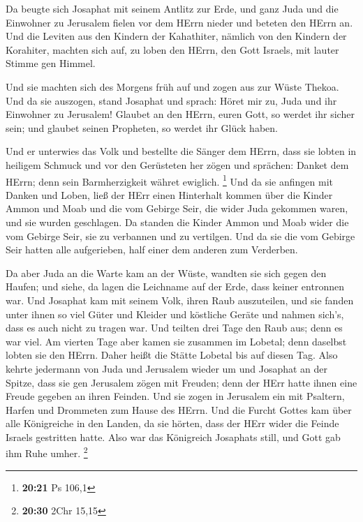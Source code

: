  Da beugte sich Josaphat mit seinem Antlitz zur Erde, und
ganz Juda und die Einwohner zu Jerusalem fielen vor dem HErrn nieder und
beteten den HErrn an.  Und die Leviten aus den Kindern der
Kahathiter, nämlich von den Kindern der Korahiter, machten sich auf, zu
loben den HErrn, den Gott Israels, mit lauter Stimme gen Himmel.

 Und sie machten sich des Morgens früh auf und zogen aus
zur Wüste Thekoa. Und da sie auszogen, stand Josaphat und sprach: Höret
mir zu, Juda und ihr Einwohner zu Jerusalem! Glaubet an den HErrn, euren
Gott, so werdet ihr sicher sein; und glaubet seinen Propheten, so werdet
ihr Glück haben.

 Und er unterwies das Volk und bestellte die Sänger dem
HErrn, dass sie lobten in heiligem Schmuck und vor den Gerüsteten her
zögen und sprächen: Danket dem HErrn; denn sein Barmherzigkeit währet
ewiglich. \footnote{\textbf{20:21} Ps 106,1}  Und da sie
anfingen mit Danken und Loben, ließ der HErr einen Hinterhalt kommen
über die Kinder Ammon und Moab und die vom Gebirge Seir, die wider Juda
gekommen waren, und sie wurden geschlagen.  Da standen die
Kinder Ammon und Moab wider die vom Gebirge Seir, sie zu verbannen und
zu vertilgen. Und da sie die vom Gebirge Seir hatten alle aufgerieben,
half einer dem anderen zum Verderben.

 Da aber Juda an die Warte kam an der Wüste, wandten sie
sich gegen den Haufen; und siehe, da lagen die Leichname auf der Erde,
dass keiner entronnen war.  Und Josaphat kam mit seinem
Volk, ihren Raub auszuteilen, und sie fanden unter ihnen so viel Güter
und Kleider und köstliche Geräte und nahmen sich's, dass es auch nicht
zu tragen war. Und teilten drei Tage den Raub aus; denn es war viel.
 Am vierten Tage aber kamen sie zusammen im Lobetal; denn
daselbst lobten sie den HErrn. Daher heißt die Stätte Lobetal bis auf
diesen Tag.  Also kehrte jedermann von Juda und Jerusalem
wieder um und Josaphat an der Spitze, dass sie gen Jerusalem zögen mit
Freuden; denn der HErr hatte ihnen eine Freude gegeben an ihren Feinden.
 Und sie zogen in Jerusalem ein mit Psaltern, Harfen und
Drommeten zum Hause des HErrn.  Und die Furcht Gottes kam
über alle Königreiche in den Landen, da sie hörten, dass der HErr wider
die Feinde Israels gestritten hatte.  Also war das
Königreich Josaphats still, und Gott gab ihm Ruhe umher. \footnote{\textbf{20:30}
  2Chr 15,15}

